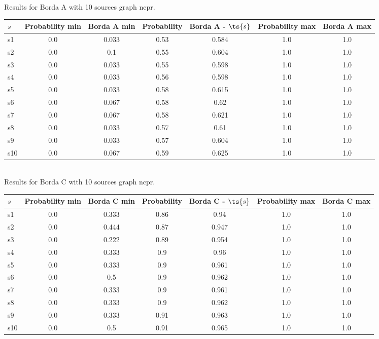 \documentclass{article}
\begin{document}
\noindent Results for Borda A with 10 sources graph ncpr.

\noindent\begin{tabular}{|l|c|c|c|c|c|c|}
\hline
$s$& Probability min & Borda A min & Probability & Borda A - $\ts{s}$ & Probability max & Borda A max\\
\hline
s1 &0.0 & 0.033 & 0.53 & 0.584 & 1.0 & 1.0\\
\hline
s2 &0.0 & 0.1 & 0.55 & 0.604 & 1.0 & 1.0\\
\hline
s3 &0.0 & 0.033 & 0.55 & 0.598 & 1.0 & 1.0\\
\hline
s4 &0.0 & 0.033 & 0.56 & 0.598 & 1.0 & 1.0\\
\hline
s5 &0.0 & 0.033 & 0.58 & 0.615 & 1.0 & 1.0\\
\hline
s6 &0.0 & 0.067 & 0.58 & 0.62 & 1.0 & 1.0\\
\hline
s7 &0.0 & 0.067 & 0.58 & 0.621 & 1.0 & 1.0\\
\hline
s8 &0.0 & 0.033 & 0.57 & 0.61 & 1.0 & 1.0\\
\hline
s9 &0.0 & 0.033 & 0.57 & 0.604 & 1.0 & 1.0\\
\hline
s10 &0.0 & 0.067 & 0.59 & 0.625 & 1.0 & 1.0\\
\hline
\end{tabular}\\

\noindent Results for Borda C with 10 sources graph ncpr.

\noindent\begin{tabular}{|l|c|c|c|c|c|c|}
\hline
$s$& Probability min & Borda C min & Probability & Borda C - $\ts{s}$ & Probability max & Borda C max\\
\hline
s1 &0.0 & 0.333 & 0.86 & 0.94 & 1.0 & 1.0\\
\hline
s2 &0.0 & 0.444 & 0.87 & 0.947 & 1.0 & 1.0\\
\hline
s3 &0.0 & 0.222 & 0.89 & 0.954 & 1.0 & 1.0\\
\hline
s4 &0.0 & 0.333 & 0.9 & 0.96 & 1.0 & 1.0\\
\hline
s5 &0.0 & 0.333 & 0.9 & 0.961 & 1.0 & 1.0\\
\hline
s6 &0.0 & 0.5 & 0.9 & 0.962 & 1.0 & 1.0\\
\hline
s7 &0.0 & 0.333 & 0.9 & 0.961 & 1.0 & 1.0\\
\hline
s8 &0.0 & 0.333 & 0.9 & 0.962 & 1.0 & 1.0\\
\hline
s9 &0.0 & 0.333 & 0.91 & 0.963 & 1.0 & 1.0\\
\hline
s10 &0.0 & 0.5 & 0.91 & 0.965 & 1.0 & 1.0\\
\hline
\end{tabular}\\
\end{document}
